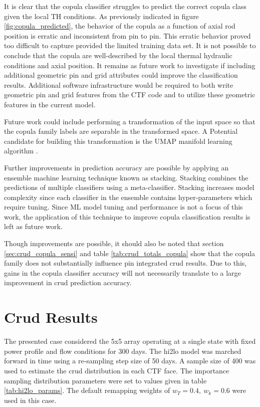It is clear that the copula classifier struggles to predict the correct copula class given the local TH conditions.  As previously indicated in figure \ref{fig:copula_predicted}, the behavior of the copula as a function of axial rod position is erratic and inconsistent from pin to pin.  This erratic behavior proved too difficult to capture provided the limited training data set.  It is not possible to conclude that the copula are well-described by the local thermal hydraulic conditions and axial position.  It remains as future work to investigate if including additional geometric pin and grid attributes could improve the classification results.  Additional software infrastructure would be required to both write geometric pin and grid features from the CTF code and to utilize these geometric features in the current model.

Future work could include performing a transformation of the input space so that the copula family labels are separable in the transformed space.  A Potential candidate for building this transformation is the UMAP manifold learning algorithm \cite{UMAP18}.

Further improvements in prediction accuracy are possible by applying an ensemble
machine learning technique known as stacking.  Stacking combines the predictions of multiple classifiers using a meta-classifier.
Stacking increases model complexity since each classifier in the ensemble contains hyper-parameters which require tuning.
Since ML model tuning and performance is not a focus of this work, the application of this technique to improve copula classification results is left as future work.

Though improvements are possible, it should also be noted that section \ref{sec:crud_copula_sensi} and table \ref{tab:crud_totals_copula} show that the copula family does not substantially influence pin integrated crud results.  Due to this, gains in the copula classifier accuracy will not necessarily translate to a large improvement in crud prediction accuracy.

\section{Crud Results}

The presented case considered the 5x5 array operating at a single state with fixed power profile and flow conditions for 300 days.  The hi2lo model was marched forward in time using a re-sampling step size of 50 days.  A sample size of 400 was used to estimate the crud distribution in each CTF face.  The importance sampling distribution parameters were set to values given in table \ref{tab:hi2lo_params}.  The default remapping weights of $w_T=0.4, \ w_k=0.6$ were used in this case.

